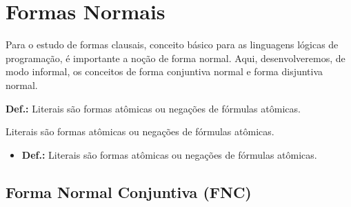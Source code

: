 \newpage

\newpage

\section{Formas Normais}
Para o estudo de formas clausais, conceito básico para as linguagens lógicas de programação, é importante a noção de forma normal. Aqui, desenvolveremos, de modo informal, os conceitos de forma conjuntiva normal e forma disjuntiva normal.

\bigskip
\noindent
\textbf{Def.:}  Literais são formas atômicas ou negações de fórmulas atômicas.

\begin{defi}
Literais são formas atômicas ou negações de fórmulas atômicas.
\end{defi}

\begin{itemize}[label={},itemindent=-3em,leftmargin=\parindent]
    \item \textbf{Def.:} Literais são formas atômicas ou negações de fórmulas atômicas.
\end{itemize}

\subsection{Forma Normal Conjuntiva (FNC)}
